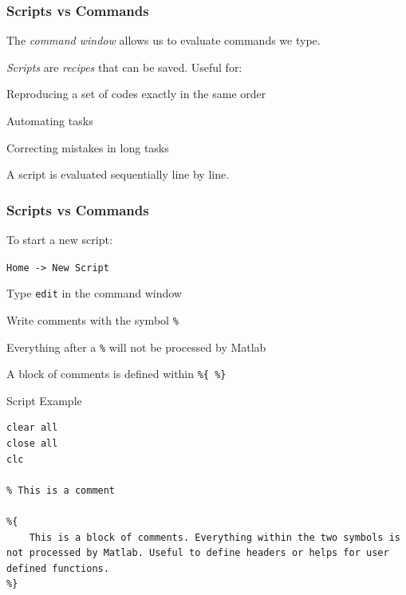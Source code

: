 \documentclass[11pt,xcolor={svgnames},aspectratio=169,usepdftitle=false]{beamer}
\let\toneitemize\itemize
\let\ttwoitemize\enditemize
\renewenvironment{itemize}{\toneitemize\addtolength{\itemsep}{1.35\baselineskip}}{\ttwoitemize}
\begin{document}
\begin{frame}
    \frametitle{Scripts vs Commands}
\begin{itemize}
    \item The \alert{\textit{command window}} allows us to evaluate commands we type.
    \item \alert{\textit{Scripts}} are \textit{recipes} that can be saved. Useful for:
    \begin{itemize}
        \item Reproducing a set of codes \alert{exactly} in the same order
        \item Automating tasks
        \item Correcting mistakes in long tasks
    \end{itemize}
    \item A script is evaluated sequentially line by line.
\end{itemize}
\end{frame}

\begin{frame}[fragile]
    \frametitle{Scripts vs Commands}
    \begin{itemize}
        \item To start a new script:
        \begin{itemize}
            \item \verb;Home -> New Script;
            \item Type \verb;edit; in the command window
        \end{itemize}
        \item Write comments with the symbol \verb;%; 
        \item Everything after a \verb;%; will not be processed by Matlab
        \item A block of comments is defined within \verb;%{ %};
    \end{itemize}
\end{frame}

\begin{frame}[fragile]{Script Example}
\begin{lstlisting}
clear all
close all 
clc

% This is a comment

%{
    This is a block of comments. Everything within the two symbols is not processed by Matlab. Useful to define headers or helps for user defined functions.
%}
\end{lstlisting}
\end{frame}
\end{document}
